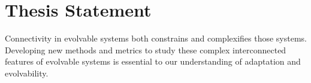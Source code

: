 \section{Thesis Statement}

Connectivity in evolvable systems both constrains and complexifies those systems.
Developing new methods and metrics to study these complex interconnected features of evolvable systems is essential to our understanding of adaptation and evolvability. 